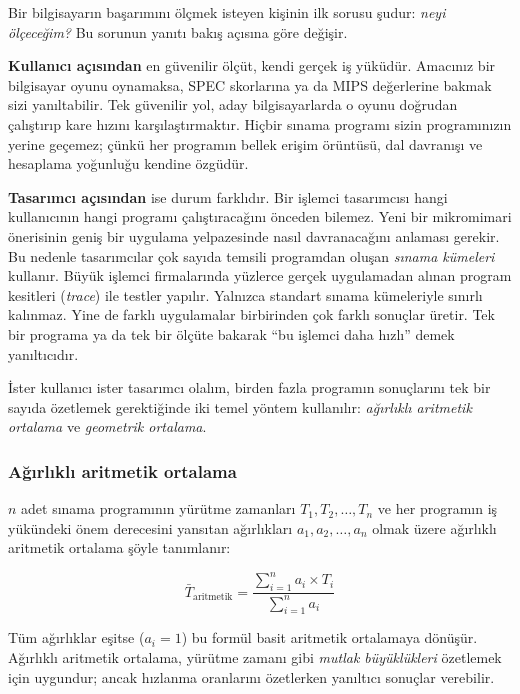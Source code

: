 Bir bilgisayarın başarımını ölçmek isteyen kişinin ilk sorusu şudur: \emph{neyi ölçeceğim?} Bu sorunun yanıtı bakış açısına göre değişir.

\textbf{Kullanıcı açısından} en güvenilir ölçüt, kendi gerçek iş yüküdür. Amacınız bir bilgisayar oyunu oynamaksa, SPEC skorlarına ya da MIPS değerlerine bakmak sizi yanıltabilir. Tek güvenilir yol, aday bilgisayarlarda o oyunu doğrudan çalıştırıp kare hızını karşılaştırmaktır. Hiçbir sınama programı sizin programınızın yerine geçemez; çünkü her programın bellek erişim örüntüsü, dal davranışı ve hesaplama yoğunluğu kendine özgüdür.

\textbf{Tasarımcı açısından} ise durum farklıdır. Bir işlemci tasarımcısı hangi kullanıcının hangi programı çalıştıracağını önceden bilemez. Yeni bir mikromimari önerisinin geniş bir uygulama yelpazesinde nasıl davranacağını anlaması gerekir. Bu nedenle tasarımcılar çok sayıda temsili programdan oluşan \emph{sınama kümeleri} kullanır. Büyük işlemci firmalarında yüzlerce gerçek uygulamadan alınan program kesitleri (\emph{trace}) ile testler yapılır. Yalnızca standart sınama kümeleriyle sınırlı kalınmaz. Yine de farklı uygulamalar birbirinden çok farklı sonuçlar üretir. Tek bir programa ya da tek bir ölçüte bakarak ``bu işlemci daha hızlı'' demek yanıltıcıdır.

İster kullanıcı ister tasarımcı olalım, birden fazla programın sonuçlarını tek bir sayıda özetlemek gerektiğinde iki temel yöntem kullanılır: \emph{ağırlıklı aritmetik ortalama} ve \emph{geometrik ortalama}.

\subsubsection*{Ağırlıklı aritmetik ortalama}

$n$ adet sınama programının yürütme zamanları $T_1, T_2, \ldots, T_n$ ve her programın iş yükündeki önem derecesini yansıtan ağırlıkları $a_1, a_2, \ldots, a_n$ olmak üzere ağırlıklı aritmetik ortalama şöyle tanımlanır:

\begin{equation}
\bar{T}_{\text{aritmetik}} = \frac{\sum_{i=1}^{n} a_i \times T_i}{\sum_{i=1}^{n} a_i}
\label{eq:agirlikli-ort}
\end{equation}

Tüm ağırlıklar eşitse ($a_i = 1$) bu formül basit aritmetik ortalamaya dönüşür. Ağırlıklı aritmetik ortalama, yürütme zamanı gibi \emph{mutlak büyüklükleri} özetlemek için uygundur; ancak hızlanma oranlarını özetlerken yanıltıcı sonuçlar verebilir.

